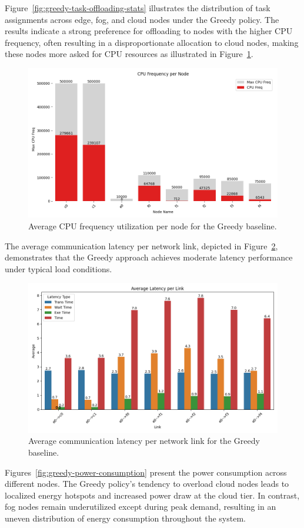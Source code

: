 \documentclass[preprint,3p,authoryear]{elsarticle}
\begin{document}
Figure~\ref{fig:greedy-task-offloading-stats} illustrates the distribution of task assignments across edge, fog, and cloud nodes under the Greedy policy. The results indicate a strong preference for offloading to nodes with the higher CPU frequency, often resulting in a disproportionate allocation to cloud nodes, making these nodes more asked for CPU resources as illustrated in Figure~\ref{fig:greedy-cpu-freq}.



\begin{figure}[H]
    \centering
    \includegraphics[width=0.5\linewidth]{figs/Greedy/cpu_frequency_per_node.png}
    \caption{Average CPU frequency utilization per node for the Greedy baseline.}
    \label{fig:greedy-cpu-freq}
\end{figure}


The average communication latency per network link, depicted in Figure~\ref{fig:greedy-avg-latency}, demonstrates that the Greedy approach achieves moderate latency performance under typical load conditions. 

\begin{figure}[H]
    \centering
    \includegraphics[width=0.5\linewidth]{figs/Greedy/avg_latency_per_link.png}
    \caption{Average communication latency per network link for the Greedy baseline.}
    \label{fig:greedy-avg-latency}
\end{figure}


Figures~\ref{fig:greedy-power-consumption} present the power consumption across different nodes. The Greedy policy's tendency to overload cloud nodes leads to localized energy hotspots and increased power draw at the cloud tier. In contrast, fog nodes remain underutilized except during peak demand, resulting in an uneven distribution of energy consumption throughout the system.
\end{document}
